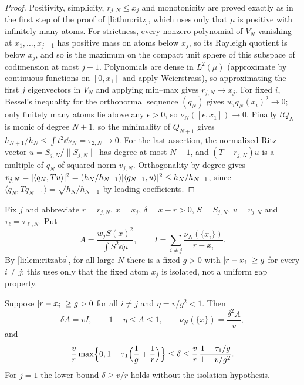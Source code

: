 \begin{proof}
Positivity, simplicity, $r_{j,N}\le x_j$ and monotonicity are proved exactly as in the first step of
the proof of \cref{li:thm:ritz}, which uses only that $\mu$ is positive with infinitely many atoms.
For strictness, every nonzero polynomial of $V_N$ vanishing at $x_1,\dots,x_{j-1}$ has positive mass on
atoms below $x_j$, so its Rayleigh quotient is below $x_j$, and so is the maximum on the compact unit
sphere of this subspace of codimension at most $j-1$. Polynomials are dense in $L^2(\mu)$ (approximate by
continuous functions on $[0,x_1]$ and apply Weierstrass), so approximating the first $j$ eigenvectors
in $V_N$ and applying min--max gives $r_{j,N}\to x_j$. For fixed $i$, Bessel's inequality for the
orthonormal sequence $(q_N)$ gives $w_iq_N(x_i)^2\to0$; only finitely many atoms lie above any
$\epsilon>0$, so $\nu_N([\epsilon,x_1])\to0$. Finally $tQ_N$ is monic of degree $N+1$, so the minimality
of $Q_{N+1}$ gives $h_{N+1}/h_N\le\int t^2\dd\nu_N=\tau_{2,N}\to0$. For the last assertion, the
normalized Ritz vector $u=S_{j,N}/\lVert S_{j,N}\rVert$ has degree at most $N-1$, and
$(T-r_{j,N})u$ is a multiple of $q_N$ of squared norm $v_{j,N}$. Orthogonality by degree gives
$v_{j,N}=\lvert\langle q_N,Tu\rangle\rvert^2=(h_N/h_{N-1})\lvert\langle q_{N-1},u\rangle\rvert^2\le h_N/h_{N-1}$,
since $\langle q_N,Tq_{N-1}\rangle=\sqrt{h_N/h_{N-1}}$ by leading coefficients.
\end{proof}

Fix $j$ and abbreviate $r=r_{j,N}$, $x=x_j$, $\delta=x-r>0$, $S=S_{j,N}$, $v=v_{j,N}$ and
$\tau_\ell=\tau_{\ell,N}$. Put
\[
 A=\frac{w_jS(x)^2}{\int S^2\dd\mu},\qquad I=\sum_{i\ne j}\frac{\nu_N(\{x_i\})}{r-x_i}.
\]
By \cref{li:lem:ritzabs}, for all large $N$ there is a fixed $g>0$ with $\lvert r-x_i\rvert\ge g$ for every
$i\ne j$; this uses only that the fixed atom $x_j$ is isolated, not a uniform gap property.

\begin{theorem}\label{li:thm:ritzid}
Suppose $\lvert r-x_i\rvert\ge g>0$ for all $i\ne j$ and $\eta=v/g^2<1$. Then
\begin{equation}\label{li:eq:ritzid}
 \delta A=vI,\qquad 1-\eta\le A\le1,\qquad \nu_N(\{x\})=\frac{\delta^2A}{v},
\end{equation}
and
\begin{equation}\label{li:eq:ritzinterval}
 \frac vr\max\Bigl\{0,1-\tau_1\Bigl(\frac1g+\frac1r\Bigr)\Bigr\}\le\delta\le
 \frac vr\,\frac{1+\tau_1/g}{1-v/g^2}.
\end{equation}
For $j=1$ the lower bound $\delta\ge v/r$ holds without the isolation hypothesis.
\end{theorem}

